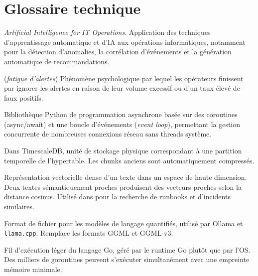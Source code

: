 \chapter{Glossaire technique}

\begin{description}[leftmargin=3.5cm, style=nextline, font=\bfseries\color{NavyBlue}]

  \item[AIOps]
    \textit{Artificial Intelligence for IT Operations}. Application des techniques
    d'apprentissage automatique et d'IA aux opérations informatiques, notamment
    pour la détection d'anomalies, la corrélation d'événements et la génération
    automatique de recommandations.

  \item[Alert fatigue]
    (\textit{fatigue d'alertes}) Phénomène psychologique par lequel les opérateurs
    finissent par ignorer les alertes en raison de leur volume excessif ou d'un
    taux élevé de faux positifs.

  \item[Asyncio]
    Bibliothèque Python de programmation asynchrone basée sur des coroutines
    (async/await) et une boucle d'événements (\textit{event loop}), permettant la
    gestion concurrente de nombreuses connexions réseau sans threads système.

  \item[Chunk]
    Dans TimescaleDB, unité de stockage physique correspondant à une partition
    temporelle de l'hypertable. Les chunks anciens sont automatiquement compressés.

  \item[Embedding]
    Représentation vectorielle dense d'un texte dans un espace de haute dimension.
    Deux textes sémantiquement proches produisent des vecteurs proches selon la
    distance cosinus. Utilisé dans \caimp{} pour la recherche de runbooks et
    d'incidents similaires.

  \item[GGUF]
    Format de fichier pour les modèles de langage quantifiés, utilisé par Ollama
    et \texttt{llama.cpp}. Remplace les formats GGML et GGML-v3.

  \item[Goroutine]
    Fil d'exécution léger du langage Go, géré par le runtime Go plutôt que par
    l'OS. Des milliers de goroutines peuvent s'exécuter simultanément avec
    une empreinte mémoire minimale.


\end{description}
